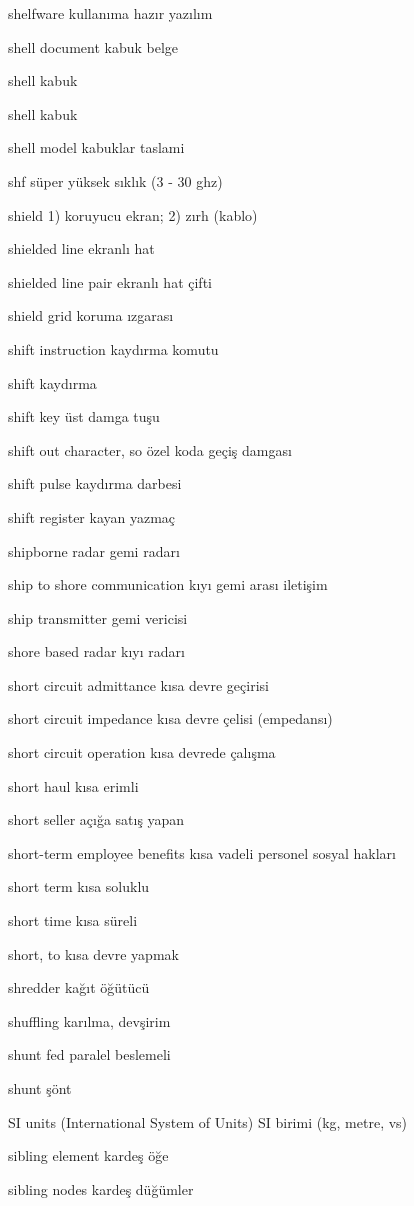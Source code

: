 \documentclass[12pt,fleqn]{article}\usepackage{../../common}
\begin{document}
shelfware kullanıma hazır yazılım

shell document kabuk belge

shell kabuk

shell kabuk

shell model kabuklar taslami

shf süper yüksek sıklık (3 - 30 ghz)

shield 1) koruyucu ekran; 2) zırh (kablo)

shielded line ekranlı hat

shielded line pair ekranlı hat çifti

shield grid koruma ızgarası

shift instruction kaydırma komutu

shift kaydırma

shift key üst damga tuşu

shift out character, so özel koda geçiş damgası

shift pulse kaydırma darbesi

shift register kayan yazmaç

shipborne radar gemi radarı

ship to shore communication kıyı gemi arası iletişim

ship transmitter gemi vericisi

shore based radar kıyı radarı

short circuit admittance kısa devre geçirisi

short circuit impedance kısa devre çelisi (empedansı)

short circuit operation kısa devrede çalışma

short haul kısa erimli

short seller açığa satış yapan

short-term employee benefits kısa vadeli personel sosyal hakları

short term kısa soluklu

short time kısa süreli

short, to kısa devre yapmak

shredder kağıt öğütücü

shuffling karılma, devşirim

shunt fed paralel beslemeli

shunt şönt

SI units (International System of Units) SI birimi (kg, metre, vs)

sibling element kardeş öğe

sibling nodes kardeş düğümler
\end{document}
